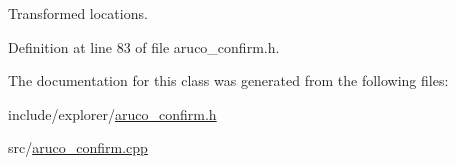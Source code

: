 Transformed locations. 



Definition at line 83 of file aruco\+\_\+confirm.\+h.



The documentation for this class was generated from the following files\+:\begin{DoxyCompactItemize}
\item 
include/explorer/\hyperlink{aruco__confirm_8h}{aruco\+\_\+confirm.\+h}\item 
src/\hyperlink{aruco__confirm_8cpp}{aruco\+\_\+confirm.\+cpp}\end{DoxyCompactItemize}
